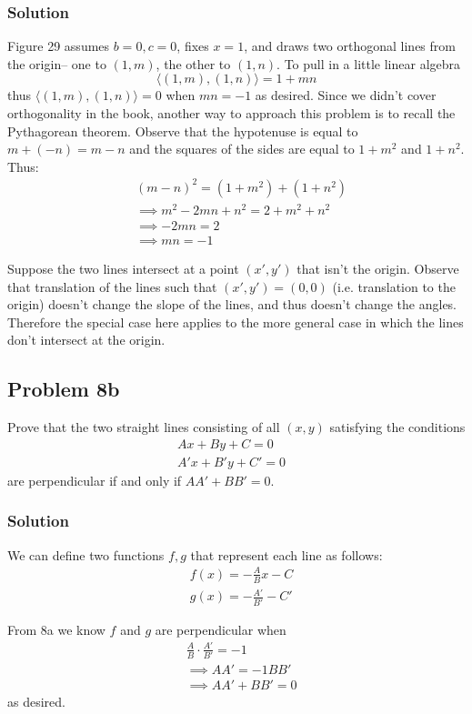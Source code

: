 \subsubsection*{Solution}
Figure 29 assumes $b=0,c=0$, fixes $x=1$, and draws two orthogonal lines from the origin-- one to $(1, m)$, the other to $(1, n)$. To pull in a little linear algebra
\[\langle(1,m), (1,n)\rangle=1+mn\]
thus $\langle(1,m), (1,n)\rangle=0$ when $mn=-1$ as desired. Since we didn't cover orthogonality in the book, another way to approach this problem is to recall the Pythagorean theorem. Observe that the hypotenuse is equal to $m+(-n)=m-n$ and the squares of the sides are equal to $1+m^2$ and $1+n^2$. Thus:
\begin{align*}
    &(m-n)^2=(1+m^2)+(1+n^2)\\
    &\implies m^2-2mn+n^2=2+m^2+n^2\\
    &\implies -2mn=2\\
    &\implies mn=-1
\end{align*}

Suppose the two lines intersect at a point $(x', y')$ that isn't the origin. Observe that translation of the lines such that $(x',y')=(0,0)$ (i.e. translation to the origin) doesn't change the slope of the lines, and thus doesn't change the angles. Therefore the special case here applies to the more general case in which the lines don't intersect at the origin.

\subsection*{Problem 8b}
Prove that the two straight lines consisting of all $(x,y)$ satisfying the conditions
\begin{align*}
    Ax+By+C=0&\\
    A'x+B'y+C'=0&
\end{align*}
are perpendicular if and only if $AA'+BB'=0$.

\subsubsection*{Solution}
We can define two functions $f, g$ that represent each line as follows:
\begin{align*}
    &f(x)=-\frac{A}{B}x-C\\
    &g(x)=-\frac{A'}{B'}-C'
\end{align*}

From 8a we know $f$ and $g$ are perpendicular when
\begin{align*}
&\frac{A}{B}\cdot\frac{A'}{B'}=-1\\
&\implies AA'=-1BB'\\
&\implies AA'+BB'=0
\end{align*}
as desired.

